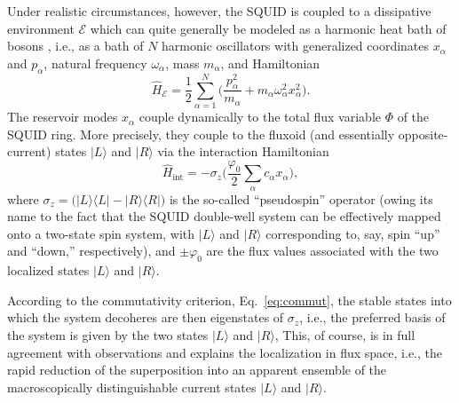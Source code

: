 \documentclass[12pt,aps,floatfix,amsmath,amssymb,showpacs,nofootinbib]{revtex4-2}
\newcommand{\be}{\begin{equation}} \newcommand{\ee}{\end{equation}}
\newcommand{\ket}[1]{\ensuremath{|{#1\rangle}}}
\newcommand{\ketbra}[2]{\ensuremath{|{#1 \rangle}{\langle #2}|}}
\begin{document}
Under realistic circumstances, however, the SQUID is coupled to a
dissipative environment $\mathcal{E}$ which can quite generally be
modeled as a harmonic heat bath of bosons \cite{Weiss:1999:tv}, i.e.,
as a bath of $N$ harmonic oscillators with generalized coordinates
$x_\alpha$ and $p_\alpha$, natural frequency $\omega_\alpha$, mass
$m_\alpha$, and Hamiltonian
%
\be
\widehat{H}_\mathcal{E} = \frac{1}{2} \sum_{\alpha=1}^N \biggl(
\frac{p^2_\alpha}{m_\alpha} + m_\alpha \omega^2_\alpha x^2_\alpha
\biggr).
\ee
%
The reservoir modes $x_\alpha$ couple dynamically to the total flux
variable $\Phi$ of the SQUID ring. More precisely, they couple to the
fluxoid (and essentially opposite-current) states $\ket{L}$ and
$\ket{R}$ via the interaction Hamiltonian \cite{Weiss:1999:tv}
%
\be
\widehat{H}_\text{int} = - \sigma_z
\biggl( \frac{\varphi_0}{2} \sum_\alpha c_\alpha x_\alpha 
\biggr), 
\ee
%
where $\sigma_z = \bigl( \ketbra{L}{L} - \ketbra{R}{R} \bigr)$ is the
so-called ``pseudospin'' operator (owing its name to the fact that the
SQUID double-well system can be effectively mapped onto a two-state
spin system, with $\ket{L}$ and $\ket{R}$ corresponding to, say, spin
``up'' and ``down,'' respectively), and $\pm \varphi_0$ are the flux
values associated with the two localized states $\ket{L}$ and $\ket{R}$.
 
According to the commutativity criterion, Eq.~\eqref{eq:commut}, the
stable states into which the system decoheres are then eigenstates of
$\sigma_z$, i.e., the preferred basis of the system is given by the
two states $\ket{L}$ and $\ket{R}$, This, of course, is in full
agreement with observations and explains the localization in flux
space, i.e., the rapid reduction of the superposition into an apparent
ensemble of the macroscopically distinguishable current states
$\ket{L}$ and $\ket{R}$.
\end{document}
